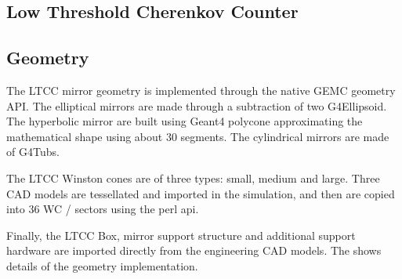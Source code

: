 \subsection{Low Threshold Cherenkov Counter}

\subsection{Geometry}
The LTCC mirror geometry is implemented through the native GEMC geometry API. The elliptical mirrors are made through a subtraction of
two G4Ellipsoid. The hyperbolic mirror are built using Geant4 polycone approximating the mathematical shape using about 30 segments.
The cylindrical mirrors are made of G4Tubs.

The LTCC Winston cones are of three types: small, medium and large. Three CAD models are tessellated and imported in the simulation, and
then are copied into 36 WC / sectors using the perl api.

Finally, the LTCC Box, mirror support structure and additional support hardware are imported directly from the engineering CAD models.
The  shows details of the geometry implementation.


